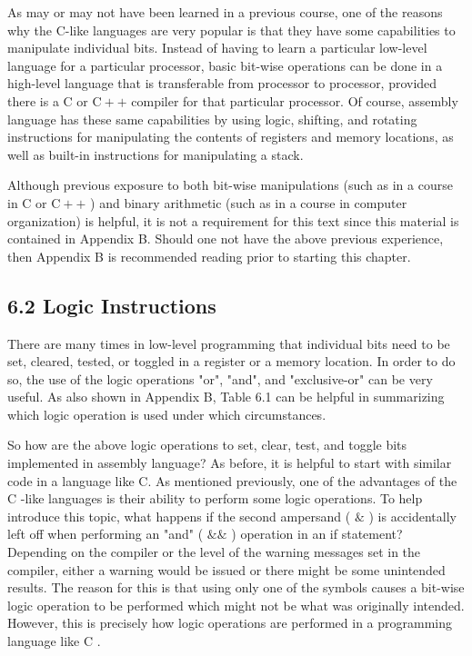 \documentclass[10pt]{article}
\begin{document}
As may or may not have been learned in a previous course, one of the reasons why the C-like languages are very popular is that they have some capabilities to manipulate individual bits. Instead of having to learn a particular low-level language for a particular processor, basic bit-wise operations can be done in a high-level language that is transferable from processor to processor, provided there is a C or $\mathrm{C}++$ compiler for that particular processor. Of course, assembly language has these same capabilities by using logic, shifting, and rotating instructions for manipulating the contents of registers and memory locations, as well as built-in instructions for manipulating a stack.

Although previous exposure to both bit-wise manipulations (such as in a course in C or $\mathrm{C}++$ ) and binary arithmetic (such as in a course in computer organization) is helpful, it is not a requirement for this text since this material is contained in Appendix B. Should one not have the above previous experience, then Appendix B is recommended reading prior to starting this chapter.

\subsection*{6.2 Logic Instructions}
There are many times in low-level programming that individual bits need to be set, cleared, tested, or toggled in a register or a memory location. In order to do so, the use of the logic operations "or", "and", and "exclusive-or" can be very useful. As also shown in Appendix B, Table 6.1 can be helpful in summarizing which logic operation is used under which circumstances.

So how are the above logic operations to set, clear, test, and toggle bits implemented in assembly language? As before, it is helpful to start with similar code in a language like C. As mentioned previously, one of the advantages of the C -like languages is their ability to perform some logic operations. To help introduce this topic, what happens if the second ampersand ( $\&$ ) is accidentally left off when performing an "and" ( $\& \&$ ) operation in an if statement? Depending on the compiler or the level of the warning messages set in the compiler, either a warning would be issued or there might be some unintended results. The reason for this is that using only one of the symbols causes a bit-wise logic operation to be performed which might not be what was originally intended. However, this is precisely how logic operations are performed in a programming language like C .
\end{document}
